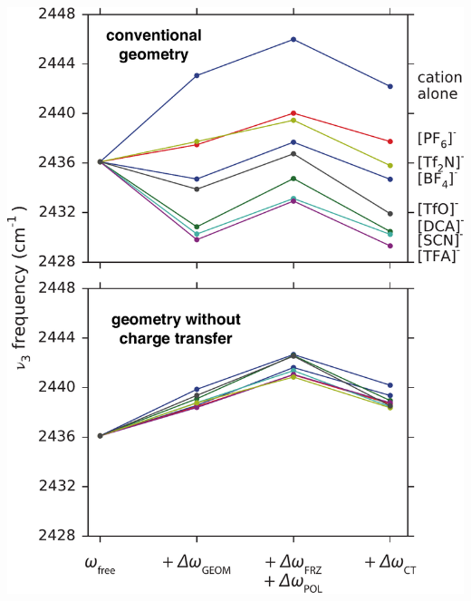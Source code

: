 \documentclass[xcolor=usenames,dvipsnames,svgnames]{beamer}
\begin{document}
\begin{frame}
  \centering
  \includegraphics[scale=0.35]{./figures/ionic_liquid_geometry_dependence_on_ct.pdf}
\end{frame}
\end{document}
